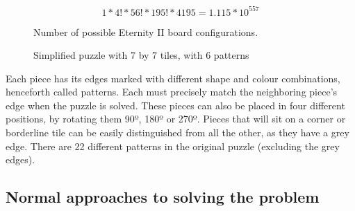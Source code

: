 \documentclass{llncs}
\begin{document}
\begin{figure}[H]
  \begin{equation}
  1 * 4! * 56! * 195! * 4195 = 1.115 * 10 ^{557}
  \end{equation}
  \caption{Number of possible Eternity II board configurations.}
  \label{fig:eq:eternity2combinations}
\end{figure}

\begin{figure}[H]
  \centering
  \hspace{5mm}
  \caption{Simplified puzzle with 7 by 7 tiles, with 6 patterns}
  \label{fig:7x7_example}
\end{figure}

Each piece has its edges marked with different shape and colour combinations, henceforth called patterns. Each must precisely match the neighboring piece's edge when the puzzle is solved. These pieces can also be placed in four different positions, by rotating them 90º, 180º or 270º. Pieces that will sit on a corner or borderline tile can be easily distinguished from all the other, as they have a grey edge. There are 22 different patterns in the original puzzle (excluding the grey edges).

\subsection{Normal approaches to solving the problem}\label{sec:normal_approaches}
\end{document}
